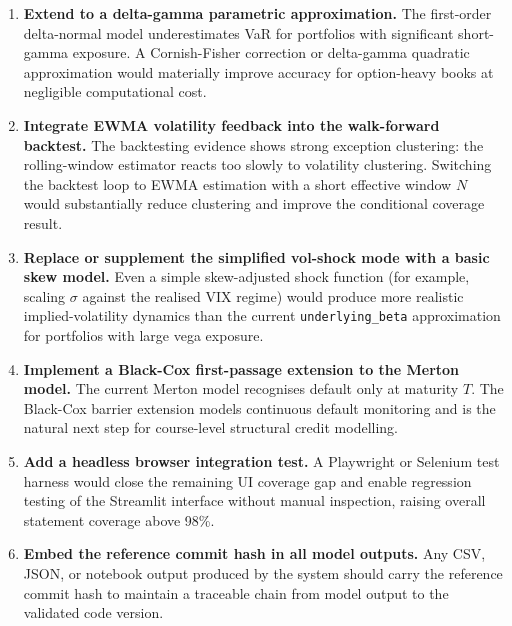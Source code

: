 \documentclass[11pt]{article}
\newcommand{\code}[1]{\texttt{#1}}
\begin{document}
\begin{enumerate}

\item \textbf{Extend to a delta-gamma parametric approximation.}  The first-order
delta-normal model underestimates VaR for portfolios with significant short-gamma
exposure.  A Cornish-Fisher correction or delta-gamma quadratic approximation
would materially improve accuracy for option-heavy books at negligible
computational cost.

\item \textbf{Integrate EWMA volatility feedback into the walk-forward backtest.}
The backtesting evidence shows strong exception clustering: the rolling-window
estimator reacts too slowly to volatility clustering.  Switching the backtest
loop to EWMA estimation with a short effective window $N$ would substantially
reduce clustering and improve the conditional coverage result.

\item \textbf{Replace or supplement the simplified vol-shock mode with a basic
skew model.}  Even a simple skew-adjusted shock function (for example, scaling
$\sigma$ against the realised VIX regime) would produce more realistic
implied-volatility dynamics than the current \code{underlying\_beta} approximation
for portfolios with large vega exposure.

\item \textbf{Implement a Black-Cox first-passage extension to the Merton model.}
The current Merton model recognises default only at maturity $T$.  The Black-Cox
barrier extension models continuous default monitoring and is the natural next
step for course-level structural credit modelling.

\item \textbf{Add a headless browser integration test.}  A Playwright or Selenium
test harness would close the remaining UI coverage gap and enable regression
testing of the Streamlit interface without manual inspection, raising overall
statement coverage above 98\%.

\item \textbf{Embed the reference commit hash in all model outputs.}  Any CSV,
JSON, or notebook output produced by the system should carry the reference commit
hash to maintain a traceable chain from model output to the validated code version.

\end{enumerate}

\end{document}

